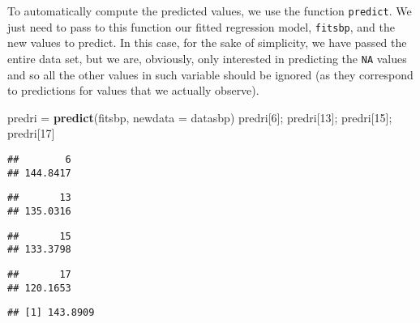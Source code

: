 \documentclass[
]{article}
\newenvironment{Shaded}{\begin{snugshade}}{\end{snugshade}}
\newcommand{\DataTypeTok}[1]{\textcolor[rgb]{0.13,0.29,0.53}{#1}}
\newcommand{\DecValTok}[1]{\textcolor[rgb]{0.00,0.00,0.81}{#1}}
\newcommand{\KeywordTok}[1]{\textcolor[rgb]{0.13,0.29,0.53}{\textbf{#1}}}
\newcommand{\NormalTok}[1]{#1}
\newcommand{\OperatorTok}[1]{\textcolor[rgb]{0.81,0.36,0.00}{\textbf{#1}}}
\newcommand{\OtherTok}[1]{\textcolor[rgb]{0.56,0.35,0.01}{#1}}
\newcommand{\StringTok}[1]{\textcolor[rgb]{0.31,0.60,0.02}{#1}}
\begin{document}
To automatically compute the predicted values, we use the function
\texttt{predict}. We just need to pass to this function our fitted
regression model, \texttt{fitsbp}, and the new values to predict. In
this case, for the sake of simplicity, we have passed the entire data
set, but we are, obviously, only interested in predicting the
\texttt{NA} values and so all the other values in such variable should
be ignored (as they correspond to predictions for values that we
actually observe).

\begin{Shaded}
\begin{Highlighting}[]
\NormalTok{predri =}\StringTok{ }\KeywordTok{predict}\NormalTok{(fitsbp, }\DataTypeTok{newdata =}\NormalTok{ datasbp)}
\NormalTok{predri[}\DecValTok{6}\NormalTok{]; predri[}\DecValTok{13}\NormalTok{]; predri[}\DecValTok{15}\NormalTok{]; predri[}\DecValTok{17}\NormalTok{]}
\end{Highlighting}
\end{Shaded}

\begin{verbatim}
##        6 
## 144.8417
\end{verbatim}

\begin{verbatim}
##       13 
## 135.0316
\end{verbatim}

\begin{verbatim}
##       15 
## 133.3798
\end{verbatim}

\begin{verbatim}
##       17 
## 120.1653
\end{verbatim}

\begin{Shaded}
\end{Shaded}

\begin{verbatim}
## [1] 143.8909
\end{verbatim}
\end{document}
